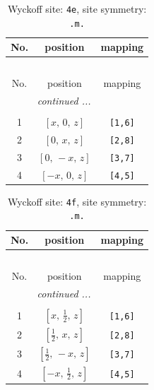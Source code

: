 \documentclass[fleqn,8pt]{jsarticle}
\begin{document}
\begin{longtable}{ccc}
\caption{Wyckoff site: {\tt 4e}, site symmetry: {\tt .m.}}
 \\
 \hline \hline
No. & position & mapping \\ \hline \endfirsthead

\multicolumn{2}{l}{\tablename\ \thetable{}} \\
 \hline \hline
No. & position & mapping \\ \hline \endhead

 \hline \hline
\multicolumn{2}{r}{\footnotesize\it continued ...} \\ \endfoot

 \hline \hline
\multicolumn{2}{r}{} \\ \endlastfoot

1 & $\left[ x,\, 0,\, z \right]$ & {\tt [1,6]} \\ \hline
2 & $\left[ 0,\, x,\, z \right]$ & {\tt [2,8]} \\ \hline
3 & $\left[ 0,\, - x,\, z \right]$ & {\tt [3,7]} \\ \hline
4 & $\left[ - x,\, 0,\, z \right]$ & {\tt [4,5]} \\
\end{longtable}
\renewcommand{\arraystretch}{1.2}
\begin{longtable}{ccc}
\caption{Wyckoff site: {\tt 4f}, site symmetry: {\tt .m.}}
 \\
 \hline \hline
No. & position & mapping \\ \hline \endfirsthead

\multicolumn{2}{l}{\tablename\ \thetable{}} \\
 \hline \hline
No. & position & mapping \\ \hline \endhead

 \hline \hline
\multicolumn{2}{r}{\footnotesize\it continued ...} \\ \endfoot

 \hline \hline
\multicolumn{2}{r}{} \\ \endlastfoot

1 & $\left[ x,\, \frac{1}{2},\, z \right]$ & {\tt [1,6]} \\ \hline
2 & $\left[ \frac{1}{2},\, x,\, z \right]$ & {\tt [2,8]} \\ \hline
3 & $\left[ \frac{1}{2},\, - x,\, z \right]$ & {\tt [3,7]} \\ \hline
4 & $\left[ - x,\, \frac{1}{2},\, z \right]$ & {\tt [4,5]} \\
\end{longtable}
\end{document}
